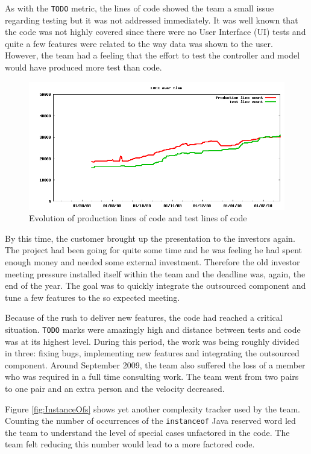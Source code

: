 \documentclass[lnbip]{svmultln}
\begin{document}
As with the \texttt{TODO} metric, the lines of code showed the team a
small issue regarding testing but it was not addressed immediately. It
was well known that the code was not highly covered since there were
no User Interface (UI) tests and quite a few features were related to
the way data was shown to the user. However, the team had a feeling
that the effort to test the controller and model would have produced
more test than code.

\begin{figure}[hbt]
  \centerline{
    \includegraphics[width=120mm]{LOCs.png}
  }
  \caption{Evolution of production lines of code and test lines of
    code}
  \label{fig:LOCs}
\end{figure}

By this time, the customer brought up the presentation to the
investors again. The project had been going for quite some time and he
was feeling he had spent enough money and needed some external
investment. Therefore the old investor meeting pressure installed
itself within the team and the deadline was, again, the end of the
year. The goal was to quickly integrate the outsourced component and
tune a few features to the so expected meeting.

Because of the rush to deliver new features, the code had reached a
critical situation. \texttt{TODO} marks were amazingly high and
distance between tests and code was at its highest level.  During this
period, the work was being roughly divided in three: fixing bugs,
implementing new features and integrating the outsourced
component. Around September 2009, the team also suffered the loss of a
member who was required in a full time consulting work. The team went
from two pairs to one pair and an extra person and the velocity
decreased.

Figure \ref{fig:InstanceOfs} shows yet another complexity tracker used
by the team. Counting the number of occurrences of the
\texttt{instanceof} Java reserved word led the team to understand the
level of special cases unfactored in the code. The team felt reducing
this number would lead to a more factored code.
\end{document}
